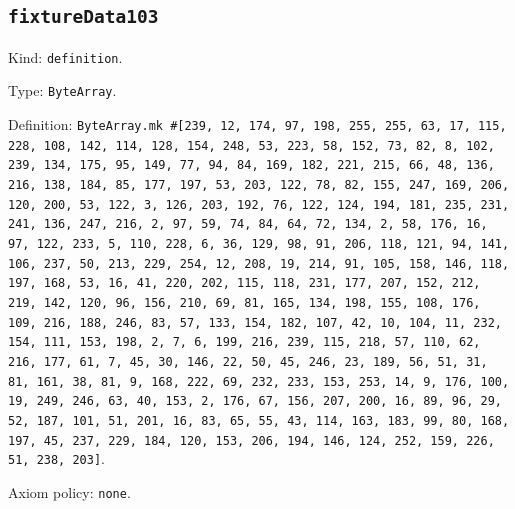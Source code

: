 \documentclass[11pt]{article}
\begin{document}
\subsection*{\texttt{fixtureData103}}
\noindent Kind: \texttt{definition}.\par
\noindent Type: \texttt{ByteArray}.\par
\noindent Definition: \texttt{ByteArray.mk \#[239, 12, 174, 97, 198, 255, 255, 63, 17, 115, 228, 108, 142, 114, 128, 154, 248, 53, 223, 58, 152, 73, 82, 8, 102, 239, 134, 175, 95, 149, 77, 94, 84, 169, 182, 221, 215, 66, 48, 136, 216, 138, 184, 85, 177, 197, 53, 203, 122, 78, 82, 155, 247, 169, 206, 120, 200, 53, 122, 3, 126, 203, 192, 76, 122, 124, 194, 181, 235, 231, 241, 136, 247, 216, 2, 97, 59, 74, 84, 64, 72, 134, 2, 58, 176, 16, 97, 122, 233, 5, 110, 228, 6, 36, 129, 98, 91, 206, 118, 121, 94, 141, 106, 237, 50, 213, 229, 254, 12, 208, 19, 214, 91, 105, 158, 146, 118, 197, 168, 53, 16, 41, 220, 202, 115, 118, 231, 177, 207, 152, 212, 219, 142, 120, 96, 156, 210, 69, 81, 165, 134, 198, 155, 108, 176, 109, 216, 188, 246, 83, 57, 133, 154, 182, 107, 42, 10, 104, 11, 232, 154, 111, 153, 198, 2, 7, 6, 199, 216, 239, 115, 218, 57, 110, 62, 216, 177, 61, 7, 45, 30, 146, 22, 50, 45, 246, 23, 189, 56, 51, 31, 81, 161, 38, 81, 9, 168, 222, 69, 232, 233, 153, 253, 14, 9, 176, 100, 19, 249, 246, 63, 40, 153, 2, 176, 67, 156, 207, 200, 16, 89, 96, 29, 52, 187, 101, 51, 201, 16, 83, 65, 55, 43, 114, 163, 183, 99, 80, 168, 197, 45, 237, 229, 184, 120, 153, 206, 194, 146, 124, 252, 159, 226, 51, 238, 203]}.\par
\noindent Axiom policy: \texttt{none}.\par
\end{document}

